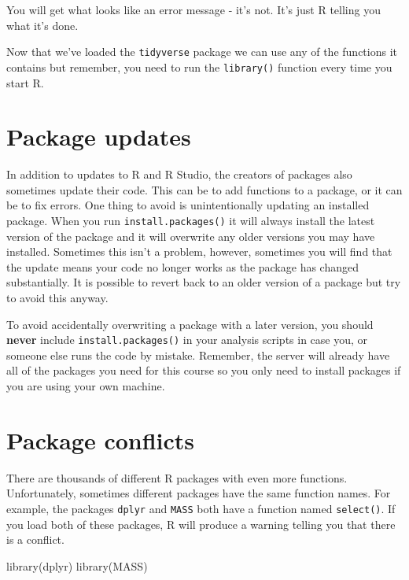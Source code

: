 \documentclass[
  oneside]{book}
\newenvironment{Shaded}{\begin{snugshade}}{\end{snugshade}}
\newcommand{\FunctionTok}[1]{\textcolor[rgb]{0.00,0.00,0.00}{#1}}
\newcommand{\NormalTok}[1]{#1}
\begin{document}
You will get what looks like an error message - it's not. It's just R telling you what it's done.

Now that we've loaded the \texttt{tidyverse} package we can use any of the functions it contains but remember, you need to run the \texttt{library()} function every time you start R.

\hypertarget{package-updates}{%
\section{Package updates}\label{package-updates}}

In addition to updates to R and R Studio, the creators of packages also sometimes update their code. This can be to add functions to a package, or it can be to fix errors. One thing to avoid is unintentionally updating an installed package. When you run \texttt{install.packages()} it will always install the latest version of the package and it will overwrite any older versions you may have installed. Sometimes this isn't a problem, however, sometimes you will find that the update means your code no longer works as the package has changed substantially. It is possible to revert back to an older version of a package but try to avoid this anyway.

\begin{danger}
To avoid accidentally overwriting a package with a later version, you
should \textbf{never} include \texttt{install.packages()} in your
analysis scripts in case you, or someone else runs the code by mistake.
Remember, the server will already have all of the packages you need for
this course so you only need to install packages if you are using your
own machine.
\end{danger}

\hypertarget{conflicts}{%
\section{Package conflicts}\label{conflicts}}

There are thousands of different R packages with even more functions. Unfortunately, sometimes different packages have the same function names. For example, the packages \texttt{dplyr} and \texttt{MASS} both have a function named \texttt{select()}. If you load both of these packages, R will produce a warning telling you that there is a conflict.

\begin{Shaded}
\begin{Highlighting}[]
\FunctionTok{library}\NormalTok{(dplyr)}
\FunctionTok{library}\NormalTok{(MASS)}
\end{Highlighting}
\end{Shaded}
\end{document}
